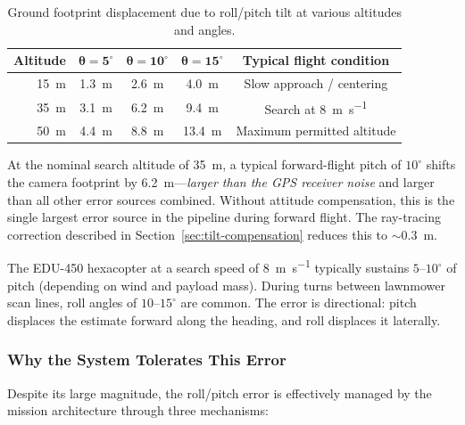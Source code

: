 \begin{table}[ht]
  \centering
  \caption{Ground footprint displacement due to roll/pitch tilt at various altitudes and angles.}
  \label{tab:tilt-error}
  \begin{tabular}{rcccc}
    \toprule
    \textbf{Altitude} & $\boldsymbol{\theta = 5^{\circ}}$ & $\boldsymbol{\theta = 10^{\circ}}$ & $\boldsymbol{\theta = 15^{\circ}}$ & \textbf{Typical flight condition} \\
    \midrule
    \SI{15}{\metre} & \SI{1.3}{\metre} & \SI{2.6}{\metre} & \SI{4.0}{\metre} & Slow approach / centering \\
    \SI{35}{\metre} & \SI{3.1}{\metre} & \SI{6.2}{\metre} & \SI{9.4}{\metre} & Search at \SI{8}{\metre\per\second} \\
    \SI{50}{\metre} & \SI{4.4}{\metre} & \SI{8.8}{\metre} & \SI{13.4}{\metre} & Maximum permitted altitude \\
    \bottomrule
  \end{tabular}
\end{table}

\noindent At the nominal search altitude of \SI{35}{\metre}, a typical forward-flight pitch of $10^{\circ}$ shifts the camera footprint by \SI{6.2}{\metre}---\emph{larger than the GPS receiver noise} and larger than all other error sources combined.  Without attitude compensation, this is the single largest error source in the pipeline during forward flight.  The ray-tracing correction described in Section~\ref{sec:tilt-compensation} reduces this to $\sim$\SI{0.3}{\metre}.

The EDU-450 hexacopter at a search speed of \SI{8}{\metre\per\second} typically sustains $5\text{--}10^{\circ}$ of pitch (depending on wind and payload mass).  During turns between lawnmower scan lines, roll angles of $10\text{--}15^{\circ}$ are common.  The error is directional: pitch displaces the estimate forward along the heading, and roll displaces it laterally.

\subsubsection{Why the System Tolerates This Error}

Despite its large magnitude, the roll/pitch error is effectively managed by the mission architecture through three mechanisms:

